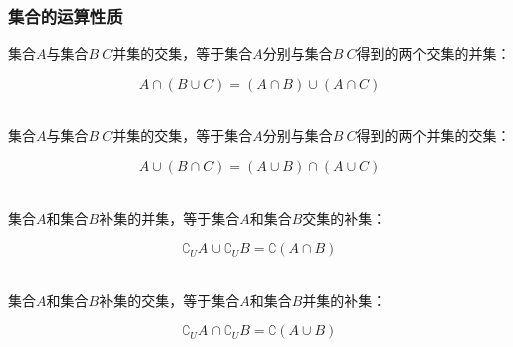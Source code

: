 \documentclass[UTF8]{ctexart}
\begin{document}
\subsubsection{集合的运算性质}
    集合$A$与集合$B~C$并集的交集，等于集合$A$分别与集合$B~C$得到的两个交集的并集：
    \begin{large}
        \begin{equation*}
            A\cap(B\cup C)=(A\cap B)\cup(A\cap C)
        \end{equation*}
    \end{large}\\
    集合$A$与集合$B~C$并集的交集，等于集合$A$分别与集合$B~C$得到的两个并集的交集：
    \begin{large}
        \begin{equation*}
            A\cup(B\cap C)=(A\cup B)\cap(A\cup C)
        \end{equation*}
    \end{large}\\
    集合$A$和集合$B$补集的并集，等于集合$A$和集合$B$交集的补集：
    \begin{large}
        \begin{equation*}
            \complement_UA\cup\complement_UB=\complement\left(A\cap B\right)
        \end{equation*}
    \end{large}\\
    集合$A$和集合$B$补集的交集，等于集合$A$和集合$B$并集的补集：
    \begin{large}
        \begin{equation*}
            \complement_UA\cap\complement_UB=\complement\left(A\cup B\right)
        \end{equation*}
    \end{large}\\

\newpage
\end{document}
